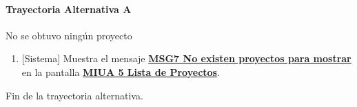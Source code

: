 \paragraph{Trayectoria Alternativa A} \label{A-PR-CU1:TA}
	No se obtuvo ningún proyecto
	\begin{enumerate}[label=A\arabic*.]
		\item {[Sistema]} Muestra el mensaje \hyperref[MSG7]{\bf MSG7 No existen proyectos para mostrar} en la pantalla \hyperref[fig:MIUA-5]{\bf MIUA 5 Lista de Proyectos}.
	\end{enumerate}
	Fin de la trayectoria alternativa.